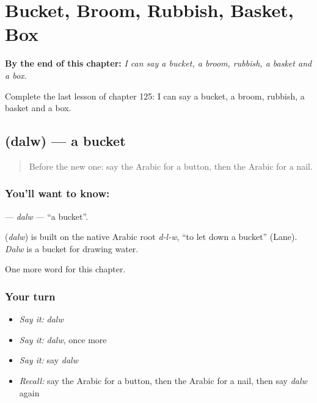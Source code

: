 
\chapter{Bucket, Broom, Rubbish, Basket, Box}
\label{ch:ar-bucket-broom-rubbish-basket-box}

\begin{chapteropening}
\textbf{By the end of this chapter:} \emph{I can say a bucket, a broom, rubbish, a basket and a box.}

Complete the last lesson of chapter 125: I can say a bucket, a broom, rubbish, a basket and a box.
\end{chapteropening}

\section[\texorpdfstring{\ar{دلو} (dalw)}{دلو (dalw)}]{ (dalw) — a bucket}

\label{lesson:AR-C125-dalw}



\begin{quote}
Before the new one: say the Arabic for a button, then the Arabic for a nail.
\end{quote}

\subsection*{You'll want to know: }
\textbf{} — \emph{dalw} — \textquotedblleft{}a bucket\textquotedblright{}.

\begin{cousinweb}
\textbf{} (\emph{dalw}) is built on the native Arabic root \emph{d-l-w}, \textquotedblleft{}to let down a bucket\textquotedblright{} (Lane). \emph{Dalw} is a bucket for drawing water.
\end{cousinweb}

\begin{grammarlens}[title={What you've built}]
One more word for this chapter.
\end{grammarlens}

\subsection*{Your turn}
\begin{itemize}
\raggedright
  \item \emph{Say it:} \emph{dalw}
  \item \emph{Say it:} \emph{dalw}, once more
  \item \emph{Say it:} say \emph{dalw}
  \item \emph{Recall:} say the Arabic for a button, then the Arabic for a nail, then say \emph{dalw} again
\end{itemize}

